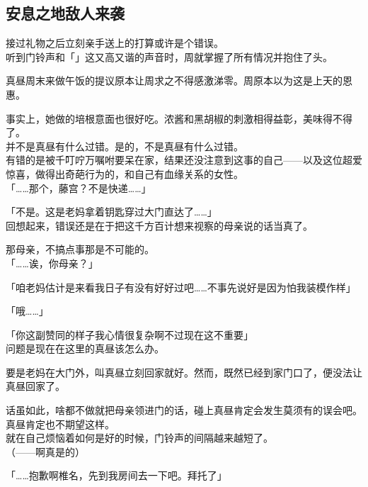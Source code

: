 \subsection{安息之地敌人来袭}

接过礼物之后立刻亲手送上的打算或许是个错误。\\

听到门铃声和「」这又高又谐的声音时，周就掌握了所有情况并抱住了头。\\

\vspace{2\baselineskip}

真昼周末来做午饭的提议原本让周求之不得感激涕零。周原本以为这是上天的恩惠。

事实上，她做的培根意面也很好吃。浓酱和黑胡椒的刺激相得益彰，美味得不得了。\\

并不是真昼有什么过错。是的，不是真昼有什么过错。\\

有错的是被千叮咛万嘱咐要呆在家，结果还没注意到这事的自己——以及这位超爱惊喜，做得出奇葩行为的，和自己有血缘关系的女性。\\

「……那个，藤宫？不是快递……」

「不是。这是老妈拿着钥匙穿过大门直达了……」\\

回想起来，错误还是在于把这千方百计想来视察的母亲说的话当真了。

那母亲，不搞点事那是不可能的。\\

「……诶，你母亲？」

「咱老妈估计是来看我日子有没有好好过吧……不事先说好是因为怕我装模作样」

「哦……」

「你这副赞同的样子我心情很复杂啊不过现在这不重要」\\

问题是现在在这里的真昼该怎么办。

要是老妈在大门外，叫真昼立刻回家就好。然而，既然已经到家门口了，便没法让真昼回家了。

话虽如此，啥都不做就把母亲领进门的话，碰上真昼肯定会发生莫须有的误会吧。真昼肯定也不期望这样。\\

就在自己烦恼着如何是好的时候，门铃声的间隔越来越短了。\\

（——啊真是的）

「……抱歉啊椎名，先到我房间去一下吧。拜托了」

